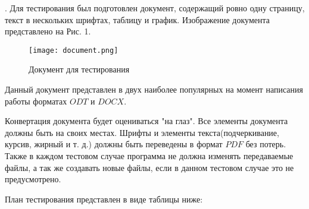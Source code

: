 \documentclass[12pt]{article}
\begin{document}
    . Для тестирования был подготовлен документ, содержащий ровно одну страницу, текст в нескольких шрифтах, таблицу и график. Изображение документа представлено на Рис. 1.
    \begin{figure}[h]
        \texttt{[image: document.png]}
        \centering
        \caption{Документ для тестирования}
    \end{figure}

    \newpage

    Данный документ представлен в двух наиболее популярных на момент написания работы форматах $ODT$ и $DOCX$.

    Конвертация документа будет оцениваться "на глаз". Все элементы документа должны быть на своих местах. Шрифты и элементы текста(подчеркивание, курсив, жирный и т. д.) должны быть переведены в формат $PDF$ без потерь. Также в каждом тестовом случае программа не должна изменять передаваемые файлы, а так же создавать новые файлы, если в данном тестовом случае это не предусмотрено.

    План тестирования представлен в виде таблицы ниже:
\end{document}
